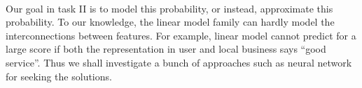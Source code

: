 \documentclass{article}
\begin{document}
\paragraph{} Our goal in task II is to model this probability, or instead, approximate this probability. To our knowledge, the linear model family can hardly model the interconnections between features. For example, linear model cannot predict for a large score if both the representation in user and local business says “good service”. Thus we shall investigate a bunch of approaches such as neural network for seeking the solutions.

\newpage



\end{document}

